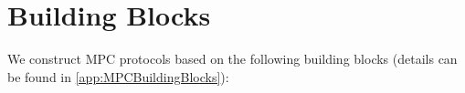 



\section{Building Blocks}
\label{sec:MPCBuildingBlocks}
We construct MPC protocols based on the following building blocks (details can be found in \autoref{app:MPCBuildingBlocks}):

